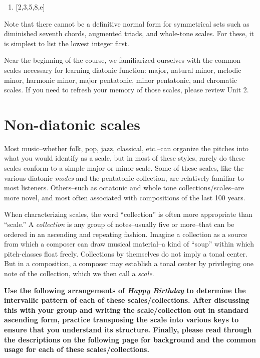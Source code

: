 \documentclass{book}
\providecommand{\tightlist}{%
  \setlength{\itemsep}{0pt}\setlength{\parskip}{0pt}}
\begin{document}
\begin{enumerate}
  \begin{enumerate}
  \def\labelenumii{\arabic{enumii}.}
  \tightlist
  \item
    {[}2,3,5,8,e{]}
  \end{enumerate}
\end{enumerate}

Note that there cannot be a definitive normal form for symmetrical sets such
as diminished seventh chords, augmented triads, and whole-tone scales. For
these, it is simplest to list the lowest integer first.

Near the beginning of the course, we familiarized ourselves with the common
scales necessary for learning diatonic function: major, natural minor, melodic
minor, harmonic minor, major pentatonic, minor pentatonic, and chromatic
scales. If you need to refresh your memory of those scales, please review Unit
2.

\hypertarget{non-diatonic-scales}{%
\section{Non-diatonic scales}\label{non-diatonic-scales}}

Most music--whether folk, pop, jazz, classical, etc.--can organize the pitches
into what you would identify as a scale, but in most of these styles, rarely
do these scales conform to a simple major or minor scale. Some of these
scales, like the various diatonic \emph{modes} and the pentatonic collection,
are relatively familiar to most listeners. Others--such as octatonic and whole
tone collections/scales--are more novel, and most often associated with
compositions of the last 100 years.

When characterizing scales, the word ``collection'' is often more appropriate
than ``scale.'' A \emph{collection} is any group of notes--usually five or
more--that can be ordered in an ascending and repeating fashion. Imagine a
collection as a source from which a composer can draw musical material--a kind
of ``soup'' within which pitch-classes float freely. Collections by themselves
do not imply a tonal center. But in a composition, a composer may establish a
tonal center by privileging one note of the collection, which we then call a
\emph{scale}.

\textbf{Use the following arrangements of \emph{Happy Birthday} to determine
the intervallic pattern of each of these scales/collections. After discussing
this with your group and writing the scale/collection out in standard
ascending form, practice transposing the scale into various keys to ensure
that you understand its structure. Finally, please read through the
descriptions on the following page for background and the common usage for
each of these scales/collections.}
\end{document}
